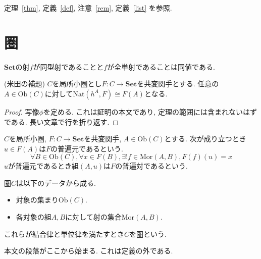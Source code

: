 \documentclass{jlreq}
\begin{document}
定理~\ref{thm}, 定義~\ref{def}, 注意~\ref{rem}, 定義~\ref{list} を参照.
\section{圏}
\begin{remark}\label{rem}
$\mathbf{Set}$の射$f$が同型射であることと$f$が全単射であることは同値である.
\end{remark}
\begin{theorem}\label{thm} (米田の補題)
$C$を局所小圏とし$F \colon C \to \mathbf{Set}$を共変関手とする. 任意の$A \in \mathrm{Ob}(C)$に対して$\mathrm{Nat}(h^A, F) \cong F(A)$となる.
\end{theorem}
\begin{proof}
写像$\phi$を定める. これは証明の本文であり, 定理の範囲には含まれないはずである. 長い文章で行を折り返す.
\end{proof}
\begin{definition}\label{def}
$C$を局所小圏, $F \colon C \to \mathbf{Set}$を共変関手, $A \in \mathrm{Ob}(C)$とする. 次が成り立つとき$u \in F(A)$は$F$の普遍元であるという.
\[ \forall B \in \mathrm{Ob}(C), \forall x \in F(B), \exists! f \in \mathrm{Mor}(A, B), F(f)(u) = x \tag{$\ast$} \]
$u$が普遍元であるとき組$(A,u)$は$F$の普遍対であるという.
\end{definition}
\begin{definition}\label{list}
圏$C$は以下のデータから成る.
\begin{itemize}
\item 対象の集まり$\mathrm{Ob}(C)$.
\item 各対象の組$A, B$に対して射の集合$\mathrm{Mor}(A,B)$.
\end{itemize}
これらが結合律と単位律を満たすとき$C$を圏という.
\end{definition}
本文の段落がここから始まる. これは定義の外である.
\end{document}
